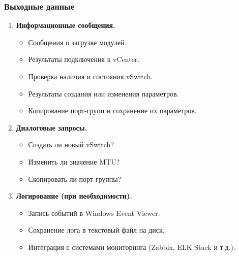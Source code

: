 \subsubsection{Выходные данные}
\begin{enumerate}
    \item \textbf{Информационные сообщения.}
    \begin{itemize}
        \item Сообщения о загрузке модулей.
        \item Результаты подключения к vCenter.
        \item Проверка наличия и состояния vSwitch.
        \item Результаты создания или изменения параметров.
        \item Копирование порт-групп и сохранение их параметров.
    \end{itemize}
    
    \item \textbf{Диалоговые запросы.}
    \begin{itemize}
        \item Создать ли новый vSwitch?
        \item Изменить ли значение MTU?
        \item Скопировать ли порт-группы?
    \end{itemize}
    
    \item \textbf{Логирование (при необходимости).}
    \begin{itemize}
        \item Запись событий в Windows Event Viewer.
        \item Сохранение лога в текстовый файл на диск.
        \item Интеграция с системами мониторинга (Zabbix, ELK Stack и т.д.).
    \end{itemize}
\end{enumerate}

